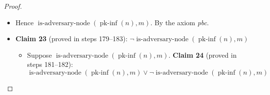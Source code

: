 \documentclass[11pt]{article}
\theoremstyle{plain}
\begin{document}
\begin{proof}
\begin{itemize}[leftmargin=2.8em, itemsep=4pt, parsep=1pt]
  \begin{itemize}[leftmargin=2.8em, itemsep=4pt, parsep=1pt]
  \item[\textbf{176--177}] Hence $\operatorname{is\text{-}adversary\text{-}node}(\operatorname{pk\text{-}inf}(n), m)$. By the axiom \emph{pbc}.
  \item[\textbf{178}] \textbf{Claim 23} (proved in steps 179--183): $\neg \operatorname{is\text{-}adversary\text{-}node}(\operatorname{pk\text{-}inf}(n), m)$
  \begin{itemize}[leftmargin=2.8em, itemsep=4pt, parsep=1pt]
  \item[\textbf{179--180}] Suppose $\operatorname{is\text{-}adversary\text{-}node}(\operatorname{pk\text{-}inf}(n), m)$. \textbf{Claim 24} (proved in steps 181--182):
\begin{equation*}
\operatorname{is\text{-}adversary\text{-}node}(\operatorname{pk\text{-}inf}(n), m) \vee \neg \operatorname{is\text{-}adversary\text{-}node}(\operatorname{pk\text{-}inf}(n), m)
\end{equation*}


\end{itemize}
\end{itemize}
\end{itemize}
\end{proof}
\end{document}
